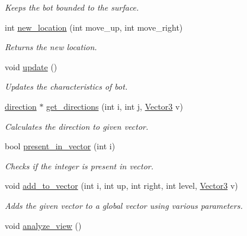 \begin{DoxyCompactItemize}
\begin{DoxyCompactList}\small\item\em Keeps the bot bounded to the surface. \end{DoxyCompactList}\item 
\hypertarget{classbots_a7bfa54c4f188be79d0efe8302613114b}{int \hyperlink{classbots_a7bfa54c4f188be79d0efe8302613114b}{new\+\_\+location} (int move\+\_\+up, int move\+\_\+right)}\label{classbots_a7bfa54c4f188be79d0efe8302613114b}

\begin{DoxyCompactList}\small\item\em Returns the new location. \end{DoxyCompactList}\item 
\hypertarget{classbots_a10b20a02c670c3ff5dba0a37c250beb6}{void \hyperlink{classbots_a10b20a02c670c3ff5dba0a37c250beb6}{update} ()}\label{classbots_a10b20a02c670c3ff5dba0a37c250beb6}

\begin{DoxyCompactList}\small\item\em Updates the characteristics of bot. \end{DoxyCompactList}\item 
\hyperlink{classdirection}{direction} $\ast$ \hyperlink{classbots_a11cb2158c03a102f7d3e6b5beb95a6f8}{get\+\_\+directions} (int i, int j, \hyperlink{class_vector3}{Vector3} v)
\begin{DoxyCompactList}\small\item\em Calculates the direction to given vector. \end{DoxyCompactList}\item 
bool \hyperlink{classbots_a0ff313e9698200bdd52c1150364e6b51}{present\+\_\+in\+\_\+vector} (int i)
\begin{DoxyCompactList}\small\item\em Checks if the integer is present in vector. \end{DoxyCompactList}\item 
void \hyperlink{classbots_a58d1c91a37cbd2973c7601268fce08c7}{add\+\_\+to\+\_\+vector} (int i, int up, int right, int level, \hyperlink{class_vector3}{Vector3} v)
\begin{DoxyCompactList}\small\item\em Adds the given vector to a global vector using various parameters. \end{DoxyCompactList}\item 
\hypertarget{classbots_aca68616e2efca8313feae0820ed0be46}{void \hyperlink{classbots_aca68616e2efca8313feae0820ed0be46}{analyze\+\_\+view} ()}\label{classbots_aca68616e2efca8313feae0820ed0be46}


\end{DoxyCompactItemize}
